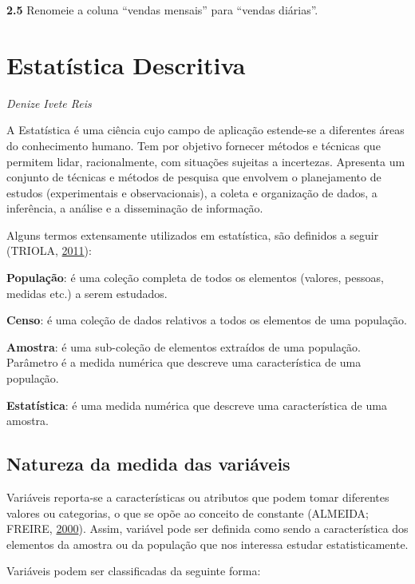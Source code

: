 \documentclass[12pt,brazil,oneside]{book}
\begin{document}
\textbf{2.5} Renomeie a coluna ``vendas mensais'' para ``vendas
diárias''.

\hypertarget{desc}{%
\chapter{Estatística Descritiva}\label{desc}}

\begin{flushright}
\emph{Denize Ivete Reis}
\end{flushright}

A Estatística é uma ciência cujo campo de aplicação estende-se a
diferentes áreas do conhecimento humano. Tem por objetivo fornecer
métodos e técnicas que permitem lidar, racionalmente, com situações
sujeitas a incertezas. Apresenta um conjunto de técnicas e métodos de
pesquisa que envolvem o planejamento de estudos (experimentais e
observacionais), a coleta e organização de dados, a inferência, a
análise e a disseminação de informação.

Alguns termos extensamente utilizados em estatística, são definidos a
seguir (TRIOLA, \protect\hyperlink{ref-triola1999}{2011}):

\textbf{População}: é uma coleção completa de todos os elementos
(valores, pessoas, medidas etc.) a serem estudados.

\textbf{Censo}: é uma coleção de dados relativos a todos os elementos de
uma população.

\textbf{Amostra}: é uma sub-coleção de elementos extraídos de uma
população. Parâmetro é a medida numérica que descreve uma característica
de uma população.

\textbf{Estatística}: é uma medida numérica que descreve uma
característica de uma amostra.

\hypertarget{natureza-da-medida-das-variaveis}{%
\section{Natureza da medida das
variáveis}\label{natureza-da-medida-das-variaveis}}

Variáveis reporta-se a características ou atributos que podem tomar
diferentes valores ou categorias, o que se opõe ao conceito de constante
(ALMEIDA; FREIRE, \protect\hyperlink{ref-almeida2000}{2000}). Assim,
variável pode ser definida como sendo a característica dos elementos da
amostra ou da população que nos interessa estudar estatisticamente.

Variáveis podem ser classificadas da seguinte forma:
\end{document}
